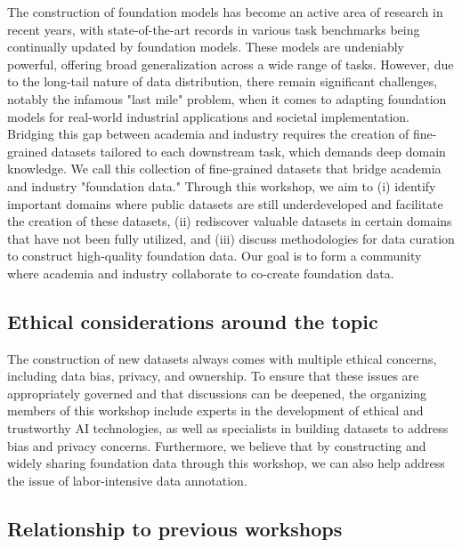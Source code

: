 \documentclass{article}
\begin{document}
The construction of foundation models has become an active area of research in recent years, with state-of-the-art records in various task benchmarks being continually updated by foundation models. These models are undeniably powerful, offering broad generalization across a wide range of tasks. However, due to the long-tail nature of data distribution, there remain significant challenges, notably the infamous "last mile" problem, when it comes to adapting foundation models for real-world industrial applications and societal implementation. Bridging this gap between academia and industry requires the creation of fine-grained datasets tailored to each downstream task, which demands deep domain knowledge. We call this collection of fine-grained datasets that bridge academia and industry "foundation data." Through this workshop, we aim to (i) identify important domains where public datasets are still underdeveloped and facilitate the creation of these datasets, (ii) rediscover valuable datasets in certain domains that have not been fully utilized, and (iii) discuss methodologies for data curation to construct high-quality foundation data. Our goal is to form a community where academia and industry collaborate to co-create foundation data.

\subsection{Ethical considerations around the topic}

The construction of new datasets always comes with multiple ethical concerns, including data bias, privacy, and ownership. To ensure that these issues are appropriately governed and that discussions can be deepened, the organizing members of this workshop include experts in the development of ethical and trustworthy AI technologies, as well as specialists in building datasets to address bias and privacy concerns. Furthermore, we believe that by constructing and widely sharing foundation data through this workshop, we can also help address the issue of labor-intensive data annotation.

\subsection{Relationship to previous workshops}
\end{document}
